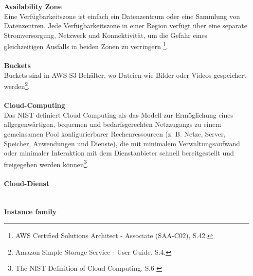 \textbf{Availability Zone}\\
Eine Verfügbarkeitszone ist einfach ein Datenzentrum oder eine Sammlung von Datenzentren. Jede Verfügbarkeitszone in einer Region verfügt über eine separate Stromversorgung, Netzwerk und Konnektivität, um die Gefahr eines gleichzeitigen Ausfalls in beiden Zonen zu verringern \footnote{AWS Certified Solutions Architect - Associate (SAA-C02), S.42.\cite{AWS1}}.
\\\\
\textbf{Buckets}\\
Buckets sind in AWS-S3 Behälter, wo Dateien wie Bilder oder Videos gespeichert werden\footnote{Amazon Simple Storage Service - User Guide. S.4.\cite{AMZ18}}.
\\\\
\textbf{Cloud-Computing}\\
Das NIST definiert Cloud Computing als das Modell zur Ermöglichung eines allgegenwärtigen, bequemen und bedarfsgerechten Netzzugangs zu einem gemeinsamen Pool konfigurierbarer Rechenressourcen (z. B. Netze, Server, Speicher, Anwendungen und Dienste), die mit minimalem Verwaltungsaufwand oder minimaler Interaktion mit dem Dienstanbieter schnell bereitgestellt und freigegeben werden können\footnote{The NIST Definition of Cloud Computing. S.6
\cite{CC1}}.
\\\\
\textbf{Cloud-Dienst}\\
\\\\
\textbf{Instance family}\\
